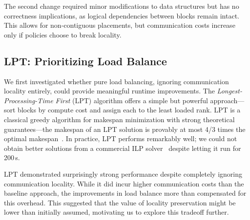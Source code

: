 The second change required minor modifications to data structures but has no correctness
implications, as logical dependencies between blocks remain intact.
This allows for non-contiguous placements, but communication costs increase only if policies choose
to break locality.

\subsection{LPT: Prioritizing Load Balance}\label{sec:amr:des:lpt}


We first investigated whether pure load balancing, ignoring communication locality entirely, could
provide meaningful runtime improvements.
The \emph{Longest-Processing-Time First} (LPT) algorithm offers a simple but powerful
approach---sort blocks by compute cost and assign each to the least loaded rank.
LPT is a classical greedy algorithm for makespan minimization with strong theoretical
guarantees---the makespan of an LPT solution is provably at most 4/3 times the optimal
makespan~\cite{Graha1969:LPT}.
In practice, LPT performs remarkably well; we could not obtain better solutions from a commercial
ILP solver~\cite{gurobi} despite letting it run for 200\,s.

LPT demonstrated surprisingly strong performance despite completely ignoring communication
locality.
While it did incur higher communication costs than the baseline approach, the improvements in load
balance more than compensated for this overhead.
This suggested that the value of locality preservation might be lower than initially assumed,
motivating us to explore this tradeoff further.

